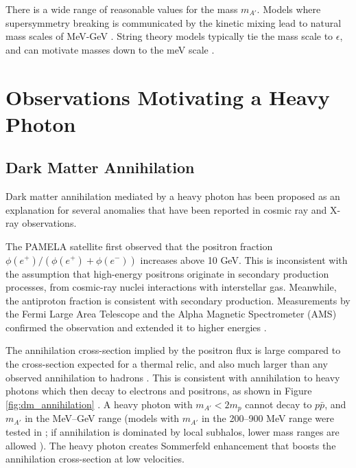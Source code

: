 There is a wide range of reasonable values for the mass $m_{A'}$.
Models where supersymmetry breaking is communicated by the kinetic mixing lead to natural mass scales of MeV-GeV \cite{baumgart_non-abelian_2009, morrissey_abelian_2009, cheung_kinetic_2009}.
String theory models typically tie the mass scale to $\epsilon$, and can motivate masses down to the meV scale \cite{goodsell_naturally_2009,cicoli_testing_2011}.

%


%
%

\section{Observations Motivating a Heavy Photon}

\subsection{Dark Matter Annihilation}

Dark matter annihilation mediated by a heavy photon has been proposed as an explanation for several anomalies that have been reported in cosmic ray and X-ray observations.

The PAMELA satellite first observed that the positron fraction $\phi(e^+)/(\phi(e^+)+\phi(e^-))$ increases above 10 GeV.
This is inconsistent with the assumption that high-energy positrons originate in secondary production processes, from cosmic-ray nuclei interactions with interstellar gas.
Meanwhile, the antiproton fraction is consistent with secondary production.
Measurements by the Fermi Large Area Telescope and the Alpha Magnetic Spectrometer (AMS) confirmed the observation and extended it to higher energies \cite{the_fermi_lat_collaboration_measurement_2012,ams_collaboration_first_2013}.

The annihilation cross-section implied by the positron flux is large compared to the cross-section expected for a thermal relic, and also much larger than any observed annihilation to hadrons \cite{cholis_high_2009}.
This is consistent with annihilation to heavy photons which then decay to electrons and positrons, as shown in Figure \ref{fig:dm_annihilation} \cite{arkani-hamed_theory_2009}.
A heavy photon with $m_{A'}<2m_p$ cannot decay to $p\bar{p}$, and $m_{A'}$ in the MeV--GeV range (models with $m_{A'}$ in the 200--900 MeV range were tested in \cite{finkbeiner_consistent_2011}; if annihilation is dominated by local subhalos, lower mass ranges are allowed \cite{slatyer_sommerfeld-enhanced_2012}).
The heavy photon creates Sommerfeld enhancement that boosts the annihilation cross-section at low velocities.

